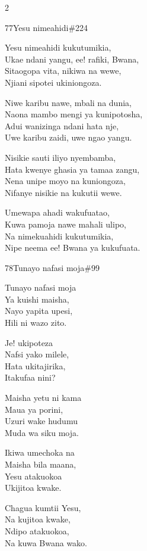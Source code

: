 \begin{multicols}{2}
\begin{hymn}{77}{Yesu nimeahidi}{\#224}
\begin{stanza}
Yesu nimeahidi kukutumikia,\\
Ukae ndani yangu, ee! rafiki, Bwana,\\
Sitaogopa vita, nikiwa na wewe,\\
Njiani sipotei ukiniongoza.
\end{stanza}
\begin{stanza}
Niwe karibu nawe, mbali na dunia,\\
Naona mambo mengi ya kunipotosha,\\
Adui wanizinga ndani hata nje,\\
Uwe karibu zaidi, uwe ngao yangu.
\end{stanza}
\begin{stanza}
Nisikie sauti iliyo nyembamba,\\
Hata kwenye ghasia ya tamaa zangu,\\
Nena unipe moyo na kuniongoza,\\
Nifanye nisikie na kukutii wewe.
\end{stanza}
\begin{stanza}
Umewapa ahadi wakufuatao,\\
Kuwa pamoja nawe mahali ulipo,\\
Na nimekuahidi kukutumikia,\\
Nipe neema ee! Bwana ya kukufuata.
\end{stanza}
\end{hymn}

\begin{hymn}{78}{Tunayo nafasi moja}{\#99}
\begin{stanza}
Tunayo nafasi moja\\
Ya kuishi maisha,\\
Nayo yapita upesi,\\
Hili ni wazo zito.
\end{stanza}
\begin{chorus}
Je! ukipoteza\\
Nafsi yako milele,\\
Hata ukitajirika,\\
Itakufaa nini?
\end{chorus}
\begin{stanza}
Maisha yetu ni kama\\
Maua ya porini,\\
Uzuri wake hudumu\\
Muda wa siku moja.
\end{stanza}
\begin{stanza}
Ikiwa umechoka na\\
Maisha bila maana,\\
Yesu atakuokoa\\
Ukijitoa kwake.
\end{stanza}
\begin{stanza}
Chagua kumtii Yesu,\\
Na kujitoa kwake,\\
Ndipo atakuokoa,\\
Na kuwa Bwana wako.
\end{stanza}
\end{hymn}


\end{multicols}
